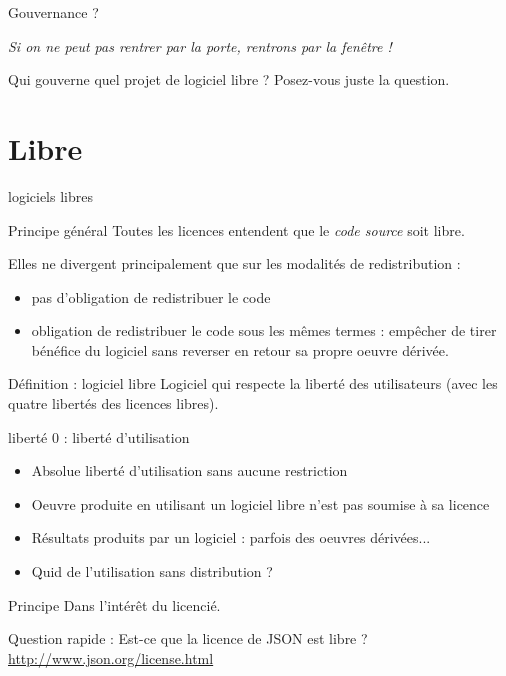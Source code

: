 \documentclass{beamer}
\begin{document}
\begin{frame}{Gouvernance ?}
  
\textit{Si on ne peut pas rentrer par la porte, rentrons par la fenêtre !}

Qui gouverne quel projet de logiciel libre ? Posez-vous juste la question.

\end{frame}



\section{Libre}

\begin{frame}{logiciels libres}

  \begin{alertblock}{Principe général}
    Toutes les licences entendent que le \textit{code source} soit libre.
  \end{alertblock}
  Elles ne divergent principalement que sur les modalités de redistribution :
  \begin{itemize}
  \item pas d'obligation de redistribuer le code
  \item obligation de redistribuer le code sous les mêmes termes : empêcher de tirer bénéfice du logiciel sans reverser en retour sa propre oeuvre dérivée.
  \end{itemize}

  \begin{alertblock}{Définition : logiciel libre}
    Logiciel qui respecte la liberté des utilisateurs (avec les quatre libertés des licences libres).    
  \end{alertblock}
  
\end{frame}


\begin{frame}{liberté 0 : liberté d'utilisation}
  \begin{itemize}
  \item Absolue liberté d'utilisation sans aucune restriction
  \item Oeuvre produite en utilisant un logiciel libre n'est pas soumise à sa licence
  \item Résultats produits par un logiciel : parfois des oeuvres dérivées...
  \item Quid de l'utilisation sans distribution ?
  \end{itemize}

  \begin{alertblock}{Principe}
    Dans l'intérêt du licencié.
  \end{alertblock}
  
  Question rapide : Est-ce que la licence de JSON est libre ? \url{http://www.json.org/license.html}

\end{frame}
\end{document}
